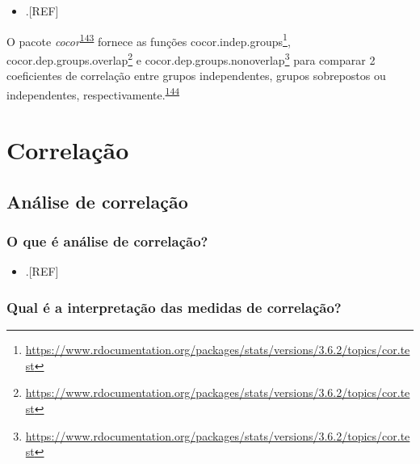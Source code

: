 \documentclass[
  a4paper,
]{book}
\providecommand{\tightlist}{%
  \setlength{\itemsep}{0pt}\setlength{\parskip}{0pt}}
\renewcommand{\href}[2]{#2\footnote{\url{#1}}}
\newenvironment{infobox}[1]
  {
  \begin{itemize}
  \renewcommand{\labelitemi}{
    \raisebox{-.7\height}[0pt][0pt]{
      {\setkeys{Gin}{width=3em,keepaspectratio}
        \texttt{[image: \#1]}}
    }
  }
  \setlength{\fboxsep}{1em}
  \begin{blackbox}
  \item
  }
  {
  \end{blackbox}
  \end{itemize}
  }
\begin{document}
\begin{itemize}
\tightlist
\item
  .{[}REF{]}
\end{itemize}

\begin{infobox}{images/Rlogo}
O pacote \emph{cocor}\textsuperscript{\protect\hyperlink{ref-cocor-4}{143}} fornece as funções \href{https://www.rdocumentation.org/packages/stats/versions/3.6.2/topics/cor.test}{cocor.indep.groups}, \href{https://www.rdocumentation.org/packages/stats/versions/3.6.2/topics/cor.test}{cocor.dep.groups.overlap} e \href{https://www.rdocumentation.org/packages/stats/versions/3.6.2/topics/cor.test}{cocor.dep.groups.nonoverlap} para comparar 2 coeficientes de correlação entre grupos independentes, grupos sobrepostos ou independentes, respectivamente.\textsuperscript{\protect\hyperlink{ref-cocor}{144}}

\end{infobox}

\hypertarget{analise-inferencial-correlacao}{%
\chapter{\texorpdfstring{\textbf{Correlação}}{Correlação}}\label{analise-inferencial-correlacao}}

\hypertarget{analise-correlacao}{%
\section{Análise de correlação}\label{analise-correlacao}}

\hypertarget{o-que-uxe9-anuxe1lise-de-correlauxe7uxe3o}{%
\subsection{O que é análise de correlação?}\label{o-que-uxe9-anuxe1lise-de-correlauxe7uxe3o}}

\begin{itemize}
\tightlist
\item
  .{[}REF{]}
\end{itemize}

\hypertarget{qual-uxe9-a-interpretauxe7uxe3o-das-medidas-de-correlauxe7uxe3o}{%
\subsection{Qual é a interpretação das medidas de correlação?}\label{qual-uxe9-a-interpretauxe7uxe3o-das-medidas-de-correlauxe7uxe3o}}
\end{document}
